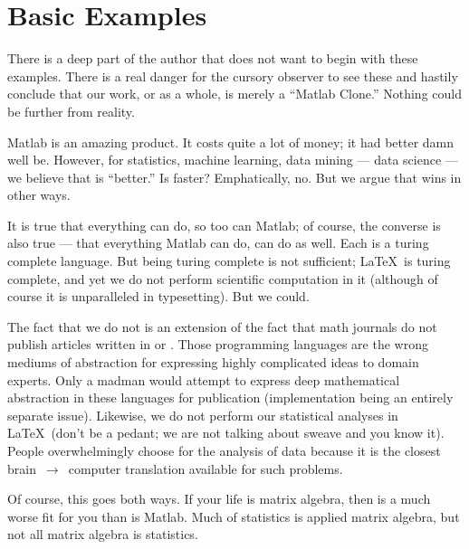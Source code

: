 


\chapter{Basic Examples}

\vspace{0.5cm}


There is a deep part of the author that does not want to begin with these examples.  There is a real danger for the cursory observer to see these and hastily conclude that our work, or  as a whole, is merely a ``Matlab Clone.''  Nothing could be further from reality.

Matlab is an amazing product.  It costs quite a lot of money; it had better damn well be.  However, for statistics, machine learning, data mining --- data science --- we believe that  is ``better.''  Is  faster?  Emphatically, no.  But we argue that  wins in other ways.

It is true that everything  can do, so too can Matlab; of course, the converse is also true --- that everything Matlab can do,  can do as well.  Each is a turing complete language.  But being turing complete is not sufficient; \LaTeX\ is turing complete, and yet we do not perform scientific computation in it (although of course it is unparalleled in typesetting).  But we could.  

The fact that we do not is an extension of the fact that math journals do not publish articles written in  or .  Those programming languages are the wrong mediums of abstraction for expressing highly complicated ideas to domain experts.  Only a madman would attempt to express deep mathematical abstraction in these languages for publication (implementation being an entirely separate issue).  Likewise, we do not perform our statistical analyses in \LaTeX\ (don't be a pedant; we are not talking about sweave and you know it).  People overwhelmingly choose  for the analysis of data because it is the closest brain~$\rightarrow$~computer translation available for such problems.

Of course, this goes both ways.  If your life is matrix algebra, then  is a much worse fit for you than is Matlab.  Much of statistics is applied matrix algebra, but not all matrix algebra is statistics.

